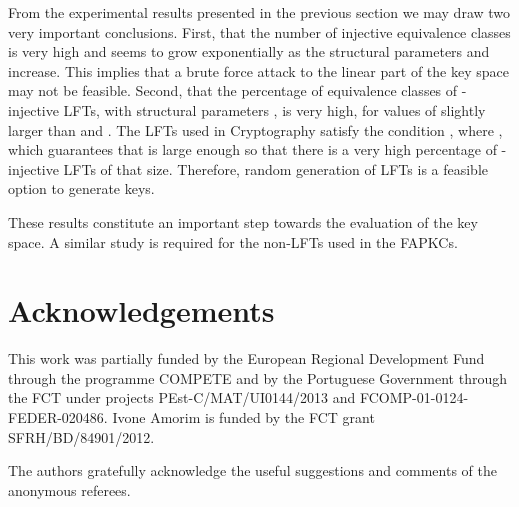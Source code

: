 \documentclass{ocg}
\newcommand{\LFT}{LFT}
\begin{document}
From the experimental
results presented in the previous section we may draw two very important conclusions. First, that the number of injective equivalence classes is very high and seems to grow exponentially as the structural parameters  and  increase. This implies that a brute force attack to the linear part of the key space may not be feasible. Second, that the percentage of
equivalence classes of -injective \LFT{}s, with structural parameters , is very high, for values of  slightly larger than  and . The \LFT{}s used in Cryptography satisfy the condition , where , which guarantees that  is large enough so that there is a very high percentage of -injective \LFT{}s of that size. Therefore, random generation of LFTs is a feasible option to generate keys. 

These results constitute an important step towards the evaluation of the key space. A similar study is required for the non-\LFT{}s used in the FAPKCs.
\section*{Acknowledgements}
This work was partially funded by the European Regional Development Fund through the programme COMPETE and by the Portuguese Government through the FCT under projects PEst-C/MAT/UI0144/2013 and  FCOMP-01-0124-FEDER-020486. Ivone Amorim is funded by the FCT grant SFRH/BD/84901/2012.

 The authors gratefully acknowledge the useful suggestions and comments of the anonymous referees.
 
\end{document}
